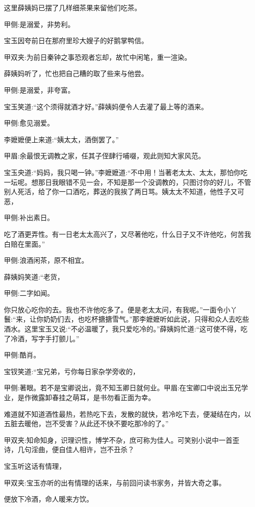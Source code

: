 \begin{parag}
    这里薛姨妈已摆了几样细茶果来留他们吃茶。\begin{note}甲侧:是溺爱，非势利。\end{note}宝玉因夸前日在那府里珍大嫂子的好鹅掌鸭信。\begin{note}甲双夹:为前日秦钟之事恐观者忘却，故忙中闲笔，重一渲染。\end{note}薛姨妈听了，忙也把自己糟的取了些来与他尝。\begin{note}甲侧:是溺爱，非夸富。\end{note}宝玉笑道:“这个须得就酒才好。”薛姨妈便令人去灌了最上等的酒来。\begin{note}甲侧:愈见溺爱。\end{note}李嬷嬷便上来道:“姨太太，酒倒罢了。”\begin{note}甲眉:余最恨无调教之家，任其子侄肆行哺啜，观此则知大家风范。\end{note}宝玉央道:“妈妈，我只喝一钟。”李嬷嬷道:“不中用！当著老太太、太太，那怕你吃一坛呢。想那日我眼错不见一会，不知是那一个没调教的，只图讨你的好儿，不管别人死活，给了你一口酒吃，葬送的我挨了两日骂。姨太太不知道，他性子又可恶，\begin{note}甲侧:补出素日。\end{note}吃了酒更弄性。有一日老太太高兴了，又尽著他吃，什么日子又不许他吃，何苦我白赔在里面。”\begin{note}甲侧:浪酒闲茶，原不相宜。\end{note}薛姨妈笑道:“老货，\begin{note}甲侧:二字如闻。\end{note}你只放心吃你的去。我也不许他吃多了。便是老太太问，有我呢。”一面令小丫鬟:“来，让你奶奶们去，也吃杯搪搪雪气。”那李嬷嬷听如此说，只得和众人去吃些酒水。这里宝玉又说:“不必温暖了，我只爱吃冷的。”薛姨妈忙道:“这可使不得，吃了冷酒，写字手打颤儿。”\begin{note}甲侧:酷肖。\end{note}宝钗笑道:“宝兄弟，亏你每日家杂学旁收的，\begin{note}甲侧:著眼。若不是宝卿说出，竟不知玉卿日就何业。甲眉:在宝卿口中说出玉兄学业，是作微露卸春挂之萌耳，是书勿看正面为幸。\end{note}难道就不知道酒性最热，若热吃下去，发散的就快，若冷吃下去，便凝结在内，以五脏去暖他，岂不受害？从此还不快不要吃那冷的了。”\begin{note}甲双夹:知命知身，识理识性，博学不杂，庶可称为佳人。可笑别小说中一首歪诗，几句淫曲，便自佳人相许，岂不丑杀？\end{note}宝玉听这话有情理，\begin{note}甲双夹:宝玉亦听的出有情理的话来，与前回问读书家务，并皆大奇之事。\end{note}便放下冷酒，命人暖来方饮。
\end{parag}


